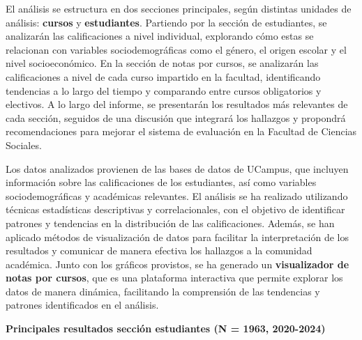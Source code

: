\documentclass[
  spanish,
  a4paper,
  oneside]{scrbook}
\begin{document}
El análisis se estructura en dos secciones principales, según distintas
unidades de análisis: \textbf{cursos} y \textbf{estudiantes}. Partiendo
por la sección de estudiantes, se analizarán las calificaciones a nivel
individual, explorando cómo estas se relacionan con variables
sociodemográficas como el género, el origen escolar y el nivel
socioeconómico. En la sección de notas por cursos, se analizarán las
calificaciones a nivel de cada curso impartido en la facultad,
identificando tendencias a lo largo del tiempo y comparando entre cursos
obligatorios y electivos. A lo largo del informe, se presentarán los
resultados más relevantes de cada sección, seguidos de una discusión que
integrará los hallazgos y propondrá recomendaciones para mejorar el
sistema de evaluación en la Facultad de Ciencias Sociales.

Los datos analizados provienen de las bases de datos de UCampus, que
incluyen información sobre las calificaciones de los estudiantes, así
como variables sociodemográficas y académicas relevantes. El análisis se
ha realizado utilizando técnicas estadísticas descriptivas y
correlacionales, con el objetivo de identificar patrones y tendencias en
la distribución de las calificaciones. Además, se han aplicado métodos
de visualización de datos para facilitar la interpretación de los
resultados y comunicar de manera efectiva los hallazgos a la comunidad
académica. Junto con los gráficos provistos, se ha generado un
\textbf{visualizador de notas por cursos}, que es una plataforma
interactiva que permite explorar los datos de manera dinámica,
facilitando la comprensión de las tendencias y patrones identificados en
el análisis.

\textbf{Principales resultados sección estudiantes (N = 1963,
2020-2024)}
\end{document}
